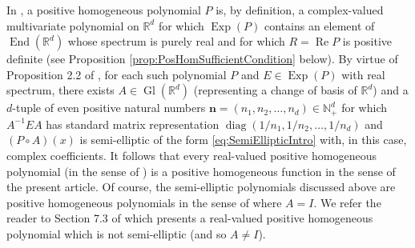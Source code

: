 \documentclass[smallextended]{svjour3}
\theoremstyle{remark}
\renewcommand\Re{\operatorname{Re}}%
\newcommand\End{\operatorname{End}} %
\newcommand\Gl{\operatorname{Gl}} %
\newcommand\Exp{\operatorname{Exp}}
\newcommand\diag{\operatorname{diag}}
\begin{document}
\begin{example}
\begin{figure}[!htb]
    \label{fig:PoneAndtwo}
\end{figure}
\begin{remark}\label{rmk:PositiveHomogeneousPolynomialsVSFunctions}
In \cite{randles_convolution_2017}, a positive homogeneous polynomial $P$ is, by definition, a complex-valued multivariate polynomial on $\mathbb{R}^d$ for which $\Exp(P)$ contains an element of $\End(\mathbb{R}^d)$ whose spectrum is purely real and for which $R=\Re P$ is positive definite (see Proposition \ref{prop:PosHomSufficientCondition} below). By virtue of Proposition 2.2 of \cite{randles_convolution_2017}, for each such polynomial $P$ and $E\in\Exp(P)$ with real spectrum, there exists $A\in\Gl(\mathbb{R}^d)$ (representing a change of basis of $\mathbb{R}^d$) and a $d$-tuple of even positive natural numbers $\mathbf{n}=(n_1,n_2,\dots,n_d)\in\mathbb{N}_+^d$ for which $A^{-1}EA$ has standard matrix representation $\diag(1/n_1,1/n_2,\dots,1/n_d)$ and $(P\circ A)(x)$ is semi-elliptic of the form \eqref{eq:SemiEllipticIntro} with, in this case, complex coefficients. It follows that every real-valued positive homogeneous polynomial (in the sense of \cite{randles_convolution_2017}) is a positive homogeneous function in the sense of the present article. Of course, the semi-elliptic polynomials discussed above are positive homogeneous polynomials in the sense of \cite{randles_convolution_2017} where $A=I$. We refer the reader to Section 7.3 of \cite{randles_convolution_2017} which presents a real-valued positive homogeneous polynomial which is not semi-elliptic (and so $A\neq I$).
\end{remark}
\end{example}
\end{document}
